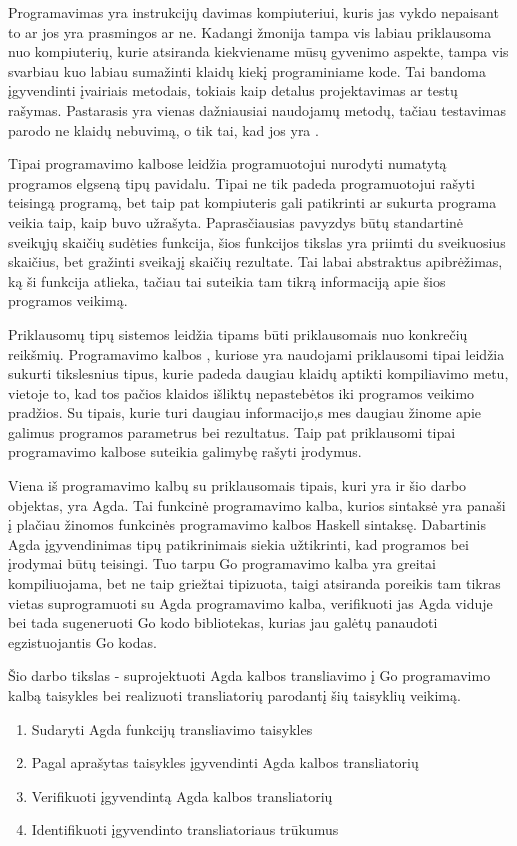 \documentclass{VUMIFPSkursinis}
\begin{document}
\tableofcontents


Programavimas yra instrukcijų davimas kompiuteriui, kuris jas vykdo nepaisant to ar jos yra prasmingos ar ne. Kadangi žmonija tampa vis labiau priklausoma nuo kompiuterių, kurie atsiranda kiekviename mūsų gyvenimo aspekte, tampa vis svarbiau kuo labiau sumažinti klaidų kiekį programiniame kode. Tai bandoma įgyvendinti įvairiais metodais, tokiais kaip detalus projektavimas ar testų rašymas. Pastarasis yra vienas dažniausiai naudojamų metodų, tačiau testavimas parodo ne klaidų nebuvimą, o tik tai, kad jos yra \cite{UHC}.
\par Tipai programavimo kalbose leidžia programuotojui nurodyti numatytą programos elgseną tipų pavidalu. Tipai ne tik padeda programuotojui rašyti teisingą programą, bet taip pat kompiuteris gali patikrinti ar sukurta programa veikia taip, kaip buvo užrašyta. Paprasčiausias pavyzdys būtų standartinė sveikųjų skaičių sudėties funkcija, šios funkcijos tikslas yra priimti  du sveikuosius skaičius, bet gražinti sveikajį skaičių rezultate. Tai labai abstraktus apibrėžimas, ką ši funkcija atlieka, tačiau tai suteikia tam tikrą informaciją apie šios programos veikimą.\par
Priklausomų tipų sistemos \cite{schematicApproach} leidžia tipams būti priklausomais nuo konkrečių reikšmių. Programavimo kalbos \cite{agda_book,idris}, kuriose yra naudojami priklausomi tipai leidžia sukurti tikslesnius tipus, kurie padeda daugiau klaidų aptikti kompiliavimo metu, vietoje to, kad tos pačios klaidos išliktų nepastebėtos iki programos veikimo pradžios. Su tipais, kurie turi daugiau informacijo,s mes daugiau žinome apie galimus programos parametrus bei rezultatus. Taip pat priklausomi tipai programavimo kalbose suteikia galimybę rašyti įrodymus.
\par Viena iš programavimo kalbų su priklausomais tipais, kuri yra ir šio darbo objektas, yra Agda. Tai funkcinė programavimo kalba, kurios sintaksė yra panaši į plačiau žinomos funkcinės programavimo kalbos Haskell \cite{haskell} sintaksę. Dabartinis Agda įgyvendinimas tipų patikrinimais siekia užtikrinti, kad programos bei įrodymai būtų teisingi. Tuo tarpu Go programavimo kalba \cite{Go} yra greitai kompiliuojama, bet ne taip griežtai tipizuota, taigi atsiranda poreikis tam tikras vietas suprogramuoti su Agda programavimo kalba, verifikuoti jas Agda viduje bei tada sugeneruoti Go kodo bibliotekas, kurias jau galėtų panaudoti egzistuojantis Go kodas.\par Šio darbo tikslas - suprojektuoti Agda kalbos transliavimo į Go programavimo kalbą taisykles bei realizuoti transliatorių parodantį šių taisyklių veikimą.
\begin{enumerate}[noitemsep]
	\item Sudaryti Agda funkcijų transliavimo taisykles
	\item Pagal aprašytas taisykles įgyvendinti Agda kalbos transliatorių
	\item Verifikuoti įgyvendintą Agda kalbos transliatorių
	\item Identifikuoti įgyvendinto transliatoriaus trūkumus 
\end{enumerate}
\end{document}
